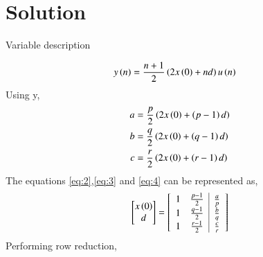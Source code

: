 \documentclass[journal,12pt,twocolumn]{IEEEtran}
\theoremstyle{remark}
\begin{document}
\section*{Solution}
\begin{table}[h]
    \centering
    
    \caption{Variable description}
    \label{tab:11.9.2.11.1}
\end{table}
\begin{align}
    y\left(n\right)&=\dfrac{n+1}{2}\left(2x\left(0\right)+nd\right)u\left(n\right)
\end{align}
Using y,
\begin{align}
    a&=\dfrac{p}{2}\left(2x\left(0\right)+\left(p-1\right)d\right)\label{eq:2}\\
    b&=\dfrac{q}{2}\left(2x\left(0\right)+\left(q-1\right)d\right)\label{eq:3}\\
    c&=\dfrac{r}{2}\left(2x\left(0\right)+\left(r-1\right)d\right)\label{eq:4}
\end{align}
The equations \eqref{eq:2},\eqref{eq:3} and \eqref{eq:4} can be represented as,
\begin{align}
    \begin{bmatrix}
        x\left(0\right)\\
        d\\
    \end{bmatrix}
    =
    \left[\begin{array}{c c|c}
        1&\frac{p-1}{2}&\frac{a}{p}\\
        1&\frac{q-1}{2}&\frac{b}{q}\\
        1&\frac{r-1}{2}&\frac{c}{r}\\
    \end{array}\right]
\end{align}
Performing row reduction,
\end{document}
